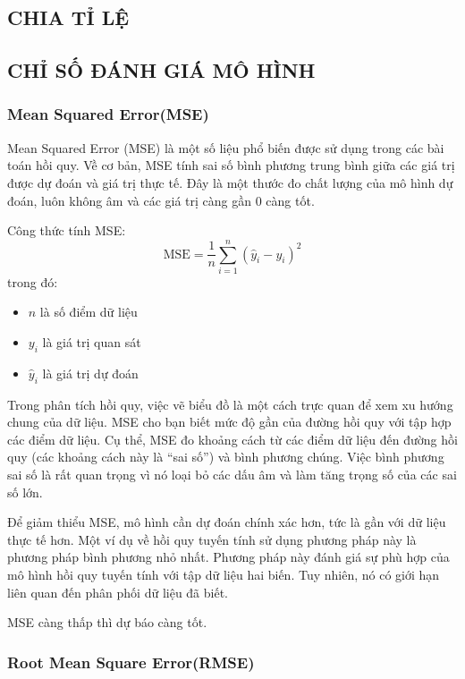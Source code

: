 \documentclass{article}
\begin{document}
\begin{multicols}{2}
\subsection{CHIA TỈ LỆ}



\subsection{CHỈ SỐ ĐÁNH GIÁ MÔ HÌNH}
\subsubsection{Mean Squared Error(MSE)}


Mean Squared Error (MSE) là một số liệu phổ biến được sử dụng trong các bài toán hồi quy. Về cơ bản, MSE tính sai số bình phương trung bình giữa các giá trị được dự đoán và giá trị thực tế. Đây là một thước đo chất lượng của mô hình dự đoán, luôn không âm và các giá trị càng gần 0 càng tốt.

Công thức tính MSE:
\[
\text{MSE} = \frac{1}{n} \sum_{i=1}^{n} (\hat{y}_i - y_i)^2
\]
trong đó:
\begin{itemize}
    \item $n$ là số điểm dữ liệu
    \item $y_i$ là giá trị quan sát
    \item $\hat{y}_i$ là giá trị dự đoán
\end{itemize}

Trong phân tích hồi quy, việc vẽ biểu đồ là một cách trực quan để xem xu hướng chung của dữ liệu. MSE cho bạn biết mức độ gần của đường hồi quy với tập hợp các điểm dữ liệu. Cụ thể, MSE đo khoảng cách từ các điểm dữ liệu đến đường hồi quy (các khoảng cách này là “sai số”) và bình phương chúng. Việc bình phương sai số là rất quan trọng vì nó loại bỏ các dấu âm và làm tăng trọng số của các sai số lớn.

Để giảm thiểu MSE, mô hình cần dự đoán chính xác hơn, tức là gần với dữ liệu thực tế hơn. Một ví dụ về hồi quy tuyến tính sử dụng phương pháp này là phương pháp bình phương nhỏ nhất. Phương pháp này đánh giá sự phù hợp của mô hình hồi quy tuyến tính với tập dữ liệu hai biến. Tuy nhiên, nó có giới hạn liên quan đến phân phối dữ liệu đã biết.

MSE càng thấp thì dự báo càng tốt.


\subsubsection{Root Mean Square Error(RMSE)}



\end{multicols}
\end{document}
